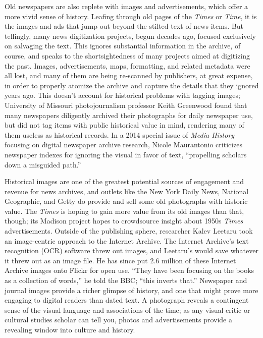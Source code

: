 Old newspapers are also replete with images and advertisements, which offer a more vivid sense of history. Leafing through old pages of the \emph{Times} or \emph{Time}, it is the images and ads that jump out beyond the stilted text of news items. But tellingly, many news digitization projects, begun decades ago, focused exclusively on salvaging the text. This ignores substantial information in the archive, of course, and speaks to the shortsightedness of many projects aimed at digitizing the past. Images, advertisements, maps, formatting, and related metadata were all lost, and many of them are being re-scanned by publishers, at great expense, in order to properly atomize the archive and capture the details that they ignored years ago. This doesn't account for historical problems with tagging images; University of Missouri photojournalism professor Keith Greenwood found that many newspapers diligently archived their photographs for daily newspaper use, but did not tag items with public historical value in mind, rendering many of them useless as historical records.\autocite{greenwood_digital_2011} In a 2014 special issue of \emph{Media History} focusing on digital newspaper archive research, Nicole Maurantonio criticizes newspaper indexes for ignoring the visual in favor of text, ``propelling scholars down a misguided path.''\autocite[90]{maurantonio_archiving_2014}

Historical images are one of the greatest potential sources of engagement and revenue for news archives, and outlets like the New York Daily News, National Geographic, and Getty do provide and sell some old photographs with historic value. The \emph{Times} is hoping to gain more value from its old images than that, though; its Madison project hopes to crowdsource insight about 1950s \emph{Times} advertisements.\autocite{_new_????} Outside of the publishing sphere, researcher Kalev Leetaru took an image-centric approach to the Internet Archive. The Internet Archive's text recognition (OCR) software threw out images, and Leetaru's would save whatever it threw out as an image file. He has since put 2.6 million of these Internet Archive images onto Flickr for open use. ``They have been focusing on the books as a collection of words,'' he told the BBC; ``this inverts that.''\autocite{kelion_millions_2014} Newspaper and journal images provide a richer glimpse of history, and one that might prove more engaging to digital readers than dated text. A photograph reveals a contingent sense of the visual language and associations of the time; as any visual critic or cultural studies scholar can tell you, photos and advertisements provide a revealing window into culture and history.


